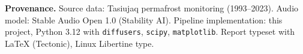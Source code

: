 \documentclass[11pt, a4paper]{article}
\begin{document}
\vspace{2em}
\begin{flushleft}
{\sffamily\small\color{footergray}%
\textbf{Provenance.}\enspace%
Source data: Tasiujaq permafrost monitoring (1993--2023).
Audio model: Stable Audio Open 1.0 (Stability AI).
Pipeline implementation: this project, Python 3.12 with
\texttt{diffusers}, \texttt{scipy}, \texttt{matplotlib}.
Report typeset with \LaTeX{} (Tectonic), Linux Libertine type.}
\end{flushleft}
\end{document}
